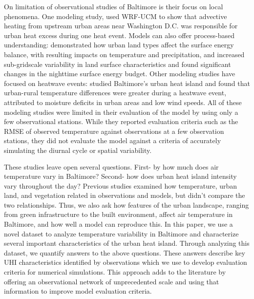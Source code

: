 \documentclass[draft,linenumbers]{agujournal}
\begin{document}
On limitation of observational studies of Baltimore is their focus on local phenomena. One modeling study,
\cite{zhang2011impact} used WRF-UCM to show that advective heating from upstream urban areas near Washington D.C. was responsible for urban heat excess during one heat event. Models can also offer process-based understanding: \cite{li2013modeling} demonstrated how urban land types affect the surface energy balance, with resulting impacts on temperature and precipitation, and \cite{li2013development} increased sub-gridscale variability in land surface characteristics and found significant changes in the nighttime surface energy budget. 
Other modeling studies have focused on heatwave events: \cite{li2013synergistic} studied Baltimore's urban heat island and found that urban-rural temperature differences were greater during a heatwave event, attributed to moisture deficits in urban areas and low wind speeds. 
All of these modeling studies were limited in their evaluation of the model by using only a few observational stations. While they reported evaluation criteria such as the RMSE of observed temperature against observations at a few observation stations, they did not evaluate the model against a criteria of accurately simulating the diurnal cycle or spatial variability.

These studies leave open several questions. First- by how much does air temperature vary in Baltimore? Second- how does urban heat island intensity vary throughout the day? Previous studies examined how temperature, urban land, and vegetation related in observations and models, but didn't compare the two relationships. Thus, we also ask how features of the urban landscape, ranging from green infrastructure to the built environment, affect air temperature in Baltimore, and how well a model can reproduce this. 
In this paper, we use a novel dataset to analyze temperature variability in Baltimore and characterize several important characteristics of the urban heat island. Through analyzing this dataset, we quantify answers to the above questions. 
These answers describe key UHI characteristics identified by observations which we use to develop evaluation criteria for numerical simulations. 
This approach adds to the literature by offering an observational network of unprecedented scale and using that information to improve model evaluation criteria. 
\end{document}
